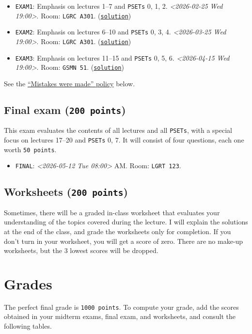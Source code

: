 \documentclass[11pt]{article}
\begin{document}
\begin{itemize}
\item \texttt{EXAM1}: Emphasis on lectures 1–7 and \texttt{PSETs} 0, 1, 2. \textit{<2026-02-25 Wed 19:00>}.
Room: \texttt{LGRC A301}. (\href{https://www.dropbox.com/scl/fi/5idb8pu63uolnypv7mgof/exam1v1solution.pdf?rlkey=rpr12umksg62hd2d426a94zuo\&dl=0}{\texttt{solution}})
\item \texttt{EXAM2}: Emphasis on lectures 6–10 and \texttt{PSETs} 0, 3, 4. \textit{<2026-03-25 Wed 19:00>}.
Room: \texttt{LGRC A301}. (\href{https://www.dropbox.com/scl/fi/685wheuhivq2iiyaerdb1/solution-e2v2.pdf?rlkey=denrm1nqf6g2lj4wkf26i3xkd\&dl=0}{\texttt{solution}})
\item \texttt{EXAM3}: Emphasis on lectures 11–15 and \texttt{PSETs} 0, 5, 6.
\textit{<2026-04-15 Wed 19:00>}. Room: \texttt{GSMN 51}. (\href{https://www.dropbox.com/scl/fi/karhbg31bksh91n3iq76o/exam3v1-solution.pdf?rlkey=ng6wg3pnabgg40g20nzu22dfw\&dl=0}{\texttt{solution}})
\end{itemize}

See the \hyperref[sec:org3afed50]{``Mistakes were made'' policy} below.

\subsection*{Final exam (\texttt{200 points})}
\label{sec:org3be0c72}
This exam evaluates the contents of all lectures and all \texttt{PSETs}, with a
special focus on lectures 17–20 and \texttt{PSETs} 0, 7. It will consist of four
questions, each one worth \texttt{50 points}.
\begin{itemize}
\item \texttt{FINAL}: \textit{<2026-05-12 Tue 08:00> } AM. Room: \texttt{LGRT 123}.
\end{itemize}

\subsection*{Worksheets (\texttt{200 points})}
\label{sec:orgb6a35bd}
Sometimes, there will be a graded in-class worksheet that evaluates your
understanding of the topics covered during the lecture. I will explain the
solutions at the end of the class, and grade the worksheets only for
completion. If you don't turn in your worksheet, you will get a score of zero.
There are no make-up worksheets, but the 3 lowest scores will be dropped.

\section*{Grades}
\label{sec:orge9f43d9}
The perfect final grade is \texttt{1000 points}. To compute your grade, add the scores
obtained in your midterm exams, final exam, and worksheets, and consult the
following tables.
\end{document}
